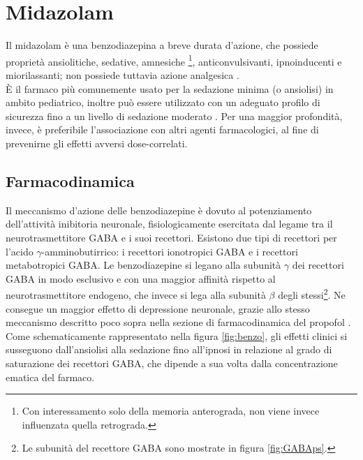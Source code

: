\section{Midazolam}

Il midazolam è una benzodiazepina a breve durata d'azione, che possiede proprietà ansiolitiche, sedative, amnesiche \footnote{Con interessamento solo della memoria anterograda, non viene invece influenzata quella retrograda.}, anticonvulsivanti, ipnoinducenti e miorilassanti; non possiede tuttavia azione analgesica \cite{Krauss2006}. 
\\ \`E il farmaco più comunemente usato per la sedazione minima (o ansiolisi) in ambito pediatrico, inoltre può essere utilizzato con un adeguato profilo di sicurezza fino a un livello di sedazione moderato \cite{Manso2019}. Per una maggior profondità, invece, è preferibile l'associazione con altri agenti farmacologici, al fine di prevenirne gli effetti avversi dose-correlati.

\subsection*{Farmacodinamica}

Il meccanismo d'azione delle benzodiazepine è dovuto al potenziamento dell'attività inibitoria neuronale, fisiologicamente esercitata dal legame tra il neurotrasmettitore GABA e i suoi recettori. Esistono due tipi di recettori per l'acido $\gamma$-amminobutirrico: i recettori ionotropici GABA e i recettori metabotropici GABA. Le benzodiazepine si legano alla subunità $\gamma$ dei recettori GABA in modo esclusivo e con una maggior affinità rispetto al neurotrasmettitore endogeno, che invece si lega alla subunità $\beta$ degli stessi\footnote{Le subunità del recettore GABA sono mostrate in figura \ref{fig:GABAps}.}. Ne consegue un maggior effetto di depressione neuronale, grazie allo stesso meccanismo descritto poco sopra nella sezione di farmacodinamica del propofol \cite{Olkkola2008}. 
\\Come schematicamente rappresentato nella figura \ref{fig:benzo}, gli effetti clinici si susseguono dall'ansiolisi alla sedazione fino all'ipnosi in relazione al grado di saturazione dei recettori GABA, che dipende a sua volta dalla concentrazione ematica del farmaco. 

